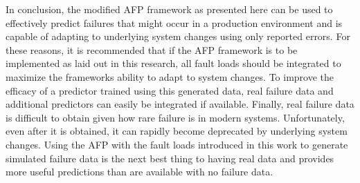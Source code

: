 In conclusion, the modified \ac{AFP} framework as presented here can be used to
effectively predict failures that might occur in a production environment and
is capable of adapting to underlying system changes using only reported errors.
For these reasons, it is recommended that if the \ac{AFP} framework is to be
implemented as laid out in this research, all fault loads should be integrated
to maximize the frameworks ability to adapt to system changes.  To improve the
efficacy of a predictor trained using this generated data, real failure data
and additional predictors can easily be integrated if available.  Finally, real
failure data is difficult to obtain given how rare failure is in modern
systems.  Unfortunately, even after it is obtained, it can rapidly become
deprecated by underlying system changes.  Using the \ac{AFP} with the fault
loads introduced in this work to generate simulated failure data is the next
best thing to having real data and provides more useful predictions than are
available with no failure data.

